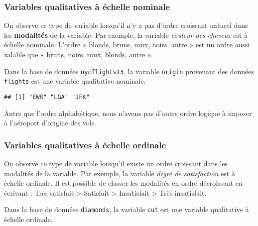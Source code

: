 \documentclass[]{book}
\newenvironment{Shaded}{\begin{snugshade}}{\end{snugshade}}
\newcommand{\KeywordTok}[1]{\textcolor[rgb]{0.13,0.29,0.53}{\textbf{#1}}}
\newcommand{\OperatorTok}[1]{\textcolor[rgb]{0.81,0.36,0.00}{\textbf{#1}}}
\newcommand{\NormalTok}[1]{#1}
\begin{document}
\subsubsection{Variables qualitatives à échelle
nominale}\label{variables-qualitatives-a-echelle-nominale}

On observe ce type de variable lorsqu'il n'y a pas d'ordre croissant
naturel dans les \textbf{modalités} de la variable. Par exemple, la
variable \emph{couleur des cheveux} est à échelle nominale. L'ordre «
blonds, bruns, roux, noirs, autre » est un ordre aussi valable que «
bruns, noirs, roux, blonds, autre ».

Dans la base de données \texttt{nycflights13}, la variable
\texttt{origin} provenant des données \texttt{flights} est une variable
qualitative nominale.

\begin{Shaded}
\end{Shaded}

\begin{verbatim}
## [1] "EWR" "LGA" "JFK"
\end{verbatim}

Autre que l'ordre alphabétique, nous n'avons pas d'autre ordre logique à
imposer à l'aéroport d'origine des vols.

\subsubsection{Variables qualitatives à échelle
ordinale}\label{variables-qualitatives-a-echelle-ordinale}

On observe ce type de variable lorsqu'il existe un ordre croissant dans
les modalités de la variable. Par exemple, la variable \emph{degré de
satisfaction} est à échelle ordinale. Il est possible de classer les
modalités en ordre décroissant en écrivant : Très satisfait
\textgreater{} Satisfait \textgreater{} Insatisfait \textgreater{} Très
insatisfait.

Dans la base de données \texttt{diamonds}, la variable \texttt{cut} est
une variable qualitative à échelle ordinale.

\begin{Shaded}
\end{Shaded}
\end{document}
